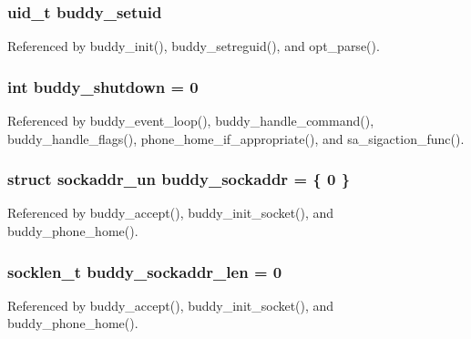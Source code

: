 \subsubsection[{buddy\_\-setuid}]{\setlength{\rightskip}{0pt plus 5cm}uid\_\-t {\bf buddy\_\-setuid}}\label{buddy_8c_a2ef8d11cc4ac2862fbe8ce2112e2e4fb}


Referenced by buddy\_\-init(), buddy\_\-setreguid(), and opt\_\-parse().

\subsubsection[{buddy\_\-shutdown}]{\setlength{\rightskip}{0pt plus 5cm}int {\bf buddy\_\-shutdown} = 0\hspace{0.3cm}{\ttfamily  [static]}}\label{buddy_8c_a9617826c673a1b5913121735ec530410}


Referenced by buddy\_\-event\_\-loop(), buddy\_\-handle\_\-command(), buddy\_\-handle\_\-flags(), phone\_\-home\_\-if\_\-appropriate(), and sa\_\-sigaction\_\-func().

\subsubsection[{buddy\_\-sockaddr}]{\setlength{\rightskip}{0pt plus 5cm}struct sockaddr\_\-un {\bf buddy\_\-sockaddr} = \{ 0 \}\hspace{0.3cm}{\ttfamily  [static]}}\label{buddy_8c_ac6fd0c340d369754b0ba41080c21377d}


Referenced by buddy\_\-accept(), buddy\_\-init\_\-socket(), and buddy\_\-phone\_\-home().

\subsubsection[{buddy\_\-sockaddr\_\-len}]{\setlength{\rightskip}{0pt plus 5cm}socklen\_\-t {\bf buddy\_\-sockaddr\_\-len} = 0\hspace{0.3cm}{\ttfamily  [static]}}\label{buddy_8c_a7f4dab67028a885153a9ec78d40f9a48}


Referenced by buddy\_\-accept(), buddy\_\-init\_\-socket(), and buddy\_\-phone\_\-home().

